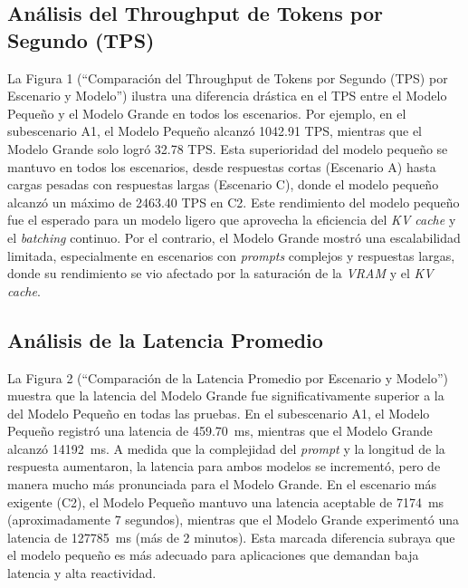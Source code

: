 \subsection*{Análisis del Throughput de Tokens por Segundo (TPS)}
La Figura 1 (``Comparación del Throughput de Tokens por Segundo (TPS) por Escenario y Modelo'') ilustra una diferencia drástica en el TPS entre el Modelo Pequeño y el Modelo Grande en todos los escenarios. Por ejemplo, en el subescenario A1, el Modelo Pequeño alcanzó 1042.91 TPS, mientras que el Modelo Grande solo logró 32.78 TPS. Esta superioridad del modelo pequeño se mantuvo en todos los escenarios, desde respuestas cortas (Escenario A) hasta cargas pesadas con respuestas largas (Escenario C), donde el modelo pequeño alcanzó un máximo de 2463.40 TPS en C2. Este rendimiento del modelo pequeño fue el esperado para un modelo ligero que aprovecha la eficiencia del \textit{KV cache} y el \textit{batching} continuo. Por el contrario, el Modelo Grande mostró una escalabilidad limitada, especialmente en escenarios con \textit{prompts} complejos y respuestas largas, donde su rendimiento se vio afectado por la saturación de la \textit{VRAM} y el \textit{KV cache}.

\subsection*{Análisis de la Latencia Promedio}
La Figura 2 (``Comparación de la Latencia Promedio por Escenario y Modelo'') muestra que la latencia del Modelo Grande fue significativamente superior a la del Modelo Pequeño en todas las pruebas. En el subescenario A1, el Modelo Pequeño registró una latencia de 459.70~ms, mientras que el Modelo Grande alcanzó 14192~ms. A medida que la complejidad del \textit{prompt} y la longitud de la respuesta aumentaron, la latencia para ambos modelos se incrementó, pero de manera mucho más pronunciada para el Modelo Grande. En el escenario más exigente (C2), el Modelo Pequeño mantuvo una latencia aceptable de 7174~ms (aproximadamente 7 segundos), mientras que el Modelo Grande experimentó una latencia de 127785~ms (más de 2 minutos). Esta marcada diferencia subraya que el modelo pequeño es más adecuado para aplicaciones que demandan baja latencia y alta reactividad.

